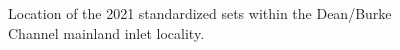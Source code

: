 \documentclass[12pt]{article}\usepackage[]{graphicx}\usepackage[]{color}
\begin{document}
\begin{figure}[htb]

{\centering {} 

}

\caption{Location of the 2021 standardized sets within the Dean/Burke Channel mainland inlet locality.\\}\label{fig:figure5}
\end{figure}
\clearpage
\end{document}
